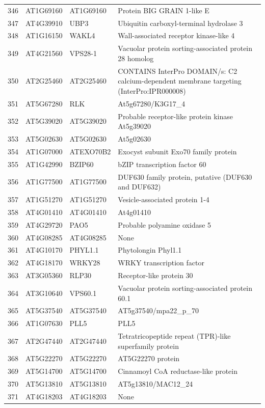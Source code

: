 \documentclass[11pt]{article}
\begin{document}
\begin{center}
\begin{tabular}{rlll}
346 & AT1G69160 & AT1G69160 & Protein BIG GRAIN 1-like E\\
347 & AT4G39910 & UBP3 & Ubiquitin carboxyl-terminal hydrolase 3\\
348 & AT1G16150 & WAKL4 & Wall-associated receptor kinase-like 4\\
349 & AT4G21560 & VPS28-1 & Vacuolar protein sorting-associated protein 28 homolog\\
350 & AT2G25460 & AT2G25460 & CONTAINS InterPro DOMAIN/s: C2 calcium-dependent membrane targeting (InterPro:IPR000008)\\
351 & AT5G67280 & RLK & At5g67280/K3G17\_4\\
352 & AT5G39020 & AT5G39020 & Probable receptor-like protein kinase At5g39020\\
353 & AT5G02630 & AT5G02630 & At5g02630\\
354 & AT1G07000 & ATEXO70B2 & Exocyst subunit Exo70 family protein\\
355 & AT1G42990 & BZIP60 & bZIP transcription factor 60\\
356 & AT1G77500 & AT1G77500 & DUF630 family protein, putative (DUF630 and DUF632)\\
357 & AT1G51270 & AT1G51270 & Vesicle-associated protein 1-4\\
358 & AT4G01410 & AT4G01410 & At4g01410\\
359 & AT4G29720 & PAO5 & Probable polyamine oxidase 5\\
360 & AT4G08285 & AT4G08285 & None\\
361 & AT4G10170 & PHYL1.1 & Phytolongin Phyl1.1\\
362 & AT4G18170 & WRKY28 & WRKY transcription factor\\
363 & AT3G05360 & RLP30 & Receptor-like protein 30\\
364 & AT3G10640 & VPS60.1 & Vacuolar protein sorting-associated protein 60.1\\
365 & AT5G37540 & AT5G37540 & AT5g37540/mpa22\_p\_70\\
366 & AT1G07630 & PLL5 & PLL5\\
367 & AT2G47440 & AT2G47440 & Tetratricopeptide repeat (TPR)-like superfamily protein\\
368 & AT5G22270 & AT5G22270 & AT5G22270 protein\\
369 & AT5G14700 & AT5G14700 & Cinnamoyl CoA reductase-like protein\\
370 & AT5G13810 & AT5G13810 & AT5g13810/MAC12\_24\\
371 & AT4G18203 & AT4G18203 & None\\

\end{tabular}
\end{center}
\end{document}
